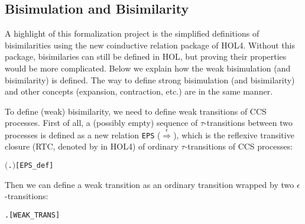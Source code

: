 
\subsection{Bisimulation and Bisimilarity}
\label{ss:bb}

A highlight of this formalization project is the simplified definitions of
  bisimilarities using the new coinductive relation package of
  HOL4. Without this package, bisimilaries can still be defined in HOL, but
  proving their properties would be more complicated. Below we explain
  how the weak bisimulation (and bisimilarity) is defined. The way to
  define strong bisimulation (and bisimilarity) and other concepts
  (expansion, contraction, etc.) are in the same manner.

To define (weak) bisimilarity, we need to define weak transitions of CCS processes. 
First of all, a (possibly empty) sequence of $\tau$-transitions between
two processes is defined as a new relation \texttt{EPS}
($\overset{\epsilon}{\Longrightarrow}$), which is the
reflexive transitive closure (RTC, denoted by \mbox{\color{blue}{$^*$}} in
HOL4) of ordinary $\tau$-transitions of CCS processes:
\begin{alltt}
 \HOLSymConst{\HOLTokenDefEquality{}} \ensuremath{(}\HOLTokenLambda{} .  \HOLTokenTransBegin\HOLSymConst{\ensuremath{\tau}}\HOLTokenTransEnd {}\ensuremath{)}\HOLSymConst{\HOLTokenSupStar{}}\hfill{[EPS_def]}
\end{alltt}
Then we can define a weak transition as an ordinary transition wrapped by
two $\epsilon$-transitions:
\begin{alltt}
 \HOLTokenWeakTransBegin{}\HOLTokenWeakTransEnd {} \HOLSymConst{\HOLTokenDefEquality{}} \HOLSymConst{\HOLTokenExists{}} .  \HOLSymConst{\HOLTokenEPS}  \HOLSymConst{\HOLTokenConj{}}  \HOLTokenTransBegin{}\HOLTokenTransEnd {} \HOLSymConst{\HOLTokenConj{}}  \HOLSymConst{\HOLTokenEPS} \hfill{[WEAK_TRANS]}
\end{alltt}

